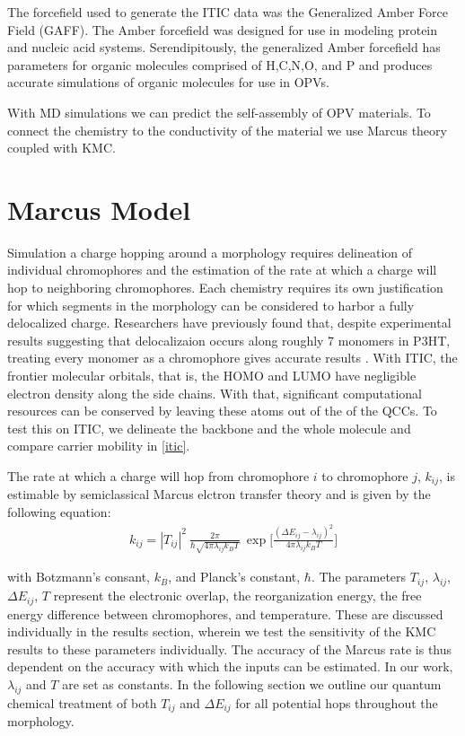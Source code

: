 The forcefield used to generate the ITIC data was the Generalized
Amber Force Field (GAFF)\cite{Wang2004a}.
The Amber forcefield was designed for use in modeling protein and
nucleic acid systems. Serendipitously, the generalized Amber forcefield has parameters for organic molecules
comprised of H,C,N,O, and P and produces accurate simulations of organic molecules for use in OPVs. 

With MD simulations we can predict the self-assembly of OPV materials. To connect the chemistry to the
conductivity of the material we use Marcus theory coupled with KMC.

\section{Marcus Model}
\label{marcusmodel}

Simulation a charge hopping around a morphology requires delineation of
individual chromophores and the estimation of the rate at which a charge will hop to neighboring
chromophores. Each chemistry requires its own justification for which segments in the morphology
can be considered to harbor a fully delocalized charge. Researchers have previously found that, 
despite experimental
results suggesting that delocalizaion occurs along roughly 7 monomers in P3HT, treating every monomer as a
chromophore gives accurate results \cite{jones2017}.
With ITIC, the frontier molecular orbitals, that is, the HOMO
and LUMO have negligible electron density along the side chains. With that, significant computational resources
can be conserved by leaving these atoms out of the of the QCCs. To test this on ITIC, we delineate the
backbone and the whole molecule and compare carrier mobility in \autoref{itic}. 

The rate at which a charge will hop from chromophore $i$ to chromophore $j$, $k_{ij}$,
is estimable by semiclassical Marcus elctron transfer theory and is given by the following equation:
\begin{align}
    k_{ij}  =  |T_{ij}|^2\ \frac{2\pi}{\hbar \sqrt{4 \pi \lambda_{ij} k_{B} T}}\ \exp{\Bigg[ \frac{(\Delta
    E_{ij} - \lambda_{ij})^2}{ 4 \pi \lambda_{ij} k_{B} T} \Bigg] }
    \label{marcus}
\end{align}

with Botzmann's consant, $k_{B}$, and Planck's constant, $\hbar$. The parameters $T_{ij}$, $\lambda_{ij}$,
$\Delta E_{ij}$, $T$ represent the electronic overlap, the reorganization energy, the free energy difference
between chromophores, and
temperature. These are discussed individually in the results section, wherein we test the sensitivity of
the KMC results to these parameters individually.
The accuracy of the Marcus rate is thus dependent on the accuracy with which the inputs can be estimated. In
our work, $\lambda_{ij}$ and $T$ are set as constants. In
the following section we outline our quantum chemical treatment of both $T_{ij}$ and $\Delta E_{ij}$ for all
potential hops throughout the morphology.

